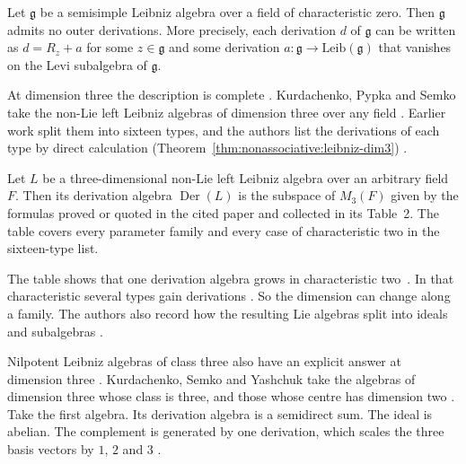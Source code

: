 \begin{proposition}
\label{prop:nonassociative:leibniz-no-outer}
Let $\mathfrak{g}$ be a semisimple Leibniz algebra over a field of
characteristic zero. Then $\mathfrak{g}$ admits no outer derivations.
More precisely, each derivation $d$ of $\mathfrak{g}$ can be written as
$d=R_z+a$ for some $z\in\mathfrak{g}$ and some derivation
$a\colon\mathfrak{g}\to \mathrm{Leib}(\mathfrak{g})$ that vanishes on
the Levi subalgebra of $\mathfrak{g}$.
\end{proposition}

At dimension three the description is complete
\cite[p.~1]{KurdachenkoPypkaSemko2026}. Kurdachenko, Pypka and Semko take the
non-Lie left Leibniz algebras of dimension three over any field
\cite[p.~1]{KurdachenkoPypkaSemko2026}. Earlier work split them into sixteen
types, and the authors list the derivations of each type by direct calculation
(Theorem~\ref{thm:nonassociative:leibniz-dim3})
\cite[p.~1]{KurdachenkoPypkaSemko2026}.\begin{theorem}\label{thm:nonassociative:leibniz-dim3} Let
$L$ be a three-dimensional non-Lie left Leibniz algebra over an arbitrary
field $F$. Then its derivation algebra $\operatorname{Der}(L)$ is the subspace
of $M_{3}(F)$ given by the formulas proved or quoted in the cited paper and
collected in its Table~2. The table covers every parameter family and every
case of characteristic two in the sixteen-type list. \end{theorem}

The table shows that one derivation algebra grows in characteristic two~\cite[p.~1]{KurdachenkoPypkaSemko2026}. In
that characteristic several types gain derivations
\cite[p.~1]{KurdachenkoPypkaSemko2026}. So the dimension can change along a
family. The authors also record how the resulting Lie algebras split into
ideals and subalgebras \cite[p.~1]{KurdachenkoPypkaSemko2026}.

Nilpotent Leibniz algebras of class three also have an explicit answer at
dimension three \cite[p.~819]{KurdachenkoSemkoYashchuk2024}. Kurdachenko,
Semko and Yashchuk take the algebras of dimension three whose class is three,
and those whose centre has dimension two
\cite[p.~819]{KurdachenkoSemkoYashchuk2024}. Take the first algebra. Its
derivation algebra is a semidirect sum. The ideal is abelian. The complement
is generated by one derivation, which scales the three basis vectors by $1$,
$2$ and $3$ \cite[Theorem~3.1, pp.~821--822]{KurdachenkoSemkoYashchuk2024}.

